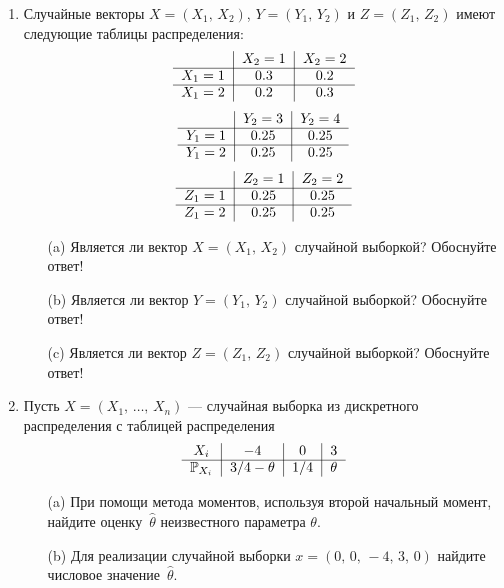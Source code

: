 \documentclass[12pt, a4paper]{article}\usepackage[]{graphicx}\usepackage[]{color}
\begin{document}
\begin{enumerate}
							\item
							Случайные векторы $X = (X_1, \, X_2)$, $Y = (Y_1, \, Y_2)$ и $Z = (Z_1, \, Z_2)$ имеют следующие таблицы распределения:
							\[
							\begin{tabular}{c|c|c}
							{}        & $X_2=1$    & $X_2=2$   \\ \cline{1-3}
							$X_1=1$   & $0.3$       & $0.2$   \\ \cline{1-3}
							$X_1=2$   & $0.2$       & $0.3$   \\
							\end{tabular}
							\]
							\[
							\begin{tabular}{c|c|c}
							{}         & $Y_2=3$     & $Y_2=4$   \\ \cline{1-3}
							$Y_1=1$   & $0.25$       & $0.25$   \\ \cline{1-3}
							$Y_1=2$    & $0.25$      & $0.25$   \\
							\end{tabular}
							\]
							\[
							\begin{tabular}{c|c|c}
							{}         & $Z_2=1$     & $Z_2=2$   \\ \cline{1-3}
							$Z_1=1$   & $0.25$       & $0.25$   \\ \cline{1-3}
							$Z_1=2$    & $0.25$      & $0.25$   \\
							\end{tabular}
							\]
							\begin{itemize}
								\item[(a)] Является ли вектор $X = (X_1, \, X_2)$ случайной выборкой? Обоснуйте ответ!
								\item[(b)] Является ли вектор $Y = (Y_1, \, Y_2)$ случайной выборкой? Обоснуйте ответ!
								\item[(c)] Является ли вектор $Z = (Z_1, \, Z_2)$ случайной выборкой? Обоснуйте ответ!
							\end{itemize}

							\item
							Пусть $X = (X_1, \, \ldots, \, X_n)$ — случайная выборка из дискретного распределения с таблицей распределения
							\[
							\begin{tabular}{c|c|c|c}
							$X_i$                & $-4$            & $0$    & $3$   \\ \cline{1-4}
							$\P_{X_i}$   & $3/4 - \theta$  & $1/4$  & $\theta$ \\
							\end{tabular}
							\]
							\begin{itemize}
								\item[(a)] При помощи метода моментов, используя второй начальный момент, найдите оценку~$\widehat{\theta}$ неизвестного параметра $\theta$.
								\item[(b)] Для реализации случайной выборки $x = (0, \, 0, \, -4, \, 3, \, 0)$ найдите числовое значение~$\widehat{\theta}$.
							\end{itemize}


\end{enumerate}
\end{document}
